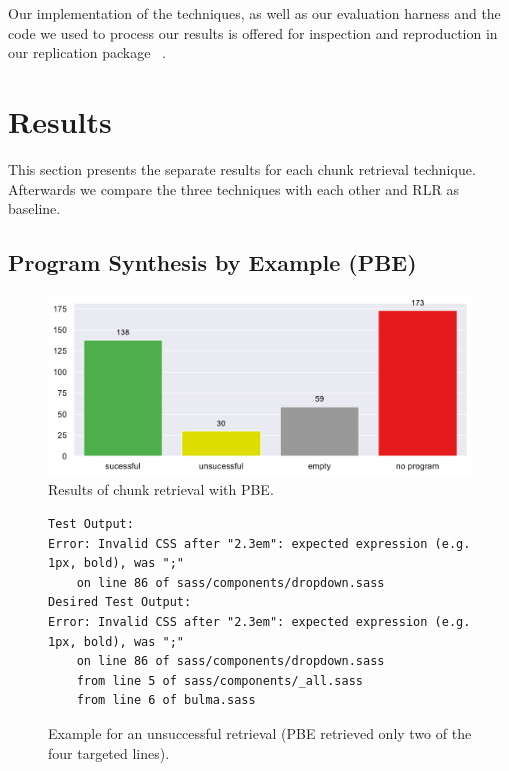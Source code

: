 Our implementation of the techniques, as well as our evaluation
harness and the code we used to process our results is offered
for inspection and reproduction in our replication package
~\cite{brandt2020chunk-replication}.

\section{Results}
This section presents the separate results for each chunk retrieval
technique.
Afterwards we compare the three techniques with each other and RLR as
baseline.



\subsection{Program Synthesis by Example (PBE)}
\label{sec:r:pbe}

\begin{figure}[tbp]
		\centering
		\includegraphics[width=\columnwidth,
		clip]{img/big-study/failure-reason-pbe.pdf}
		\caption{Results of chunk retrieval with PBE.}
		\label{fig:failure-reason-PBE}
\end{figure}

\begin{figure}[!t]
  \centering
  \begin{lstlisting}[breaklines=true]
Test Output:
Error: Invalid CSS after "2.3em": expected expression (e.g.
1px, bold), was ";"
	on line 86 of sass/components/dropdown.sass
Desired Test Output:
Error: Invalid CSS after "2.3em": expected expression (e.g.
1px, bold), was ";"
	on line 86 of sass/components/dropdown.sass
	from line 5 of sass/components/_all.sass
	from line 6 of bulma.sass
  \end{lstlisting}
  \caption{Example for an unsuccessful retrieval (PBE retrieved only
  two of the four targeted lines).}
  \label{lst:pbe-unsuccessful}
\end{figure}

